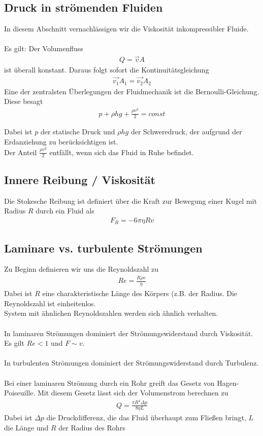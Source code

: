 \documentclass[a4paper,12pt]{report}
\begin{document}
\subsection{Druck in strömenden Fluiden}
In diesem Abschnitt vernachlässigen wir die Viskosität inkompressibler Fluide. \\
\\
Es gilt: Der Volumenfluss 
\begin{align}
Q = \vec{v} A 
\end{align}
ist überall konstant. Daraus folgt sofort die Kontinuitätsgleichung 
\begin{align}
\vec{v_1}A_1 = \vec{v_2}A_2
\end{align}
Eine der zentralsten Überlegungen der Fluidmechanik ist die Bernoulli-Gleichung. Diese besagt
\begin{align}
p + \rho hg + \frac{\rho v^2}{2} = const 
\end{align}

Dabei ist $p$ der statische Druck und $\rho hg$ der Schweredruck, der aufgrund der Erdanziehung zu berücksichtigen ist. \\
Der Anteil $\frac{\rho v^2}{2} $ entfällt, wenn sich das Fluid in Ruhe befindet.

\subsection{Innere Reibung / Viskosität}
Die Stokesche Reibung ist definiert über die Kraft zur Bewegung einer Kugel mit Radius $R$ durch ein Fluid als 
\begin{align}
F_R = -6\pi \eta Rv
\end{align}

\subsection{Laminare vs. turbulente Strömungen}
Zu Beginn definieren wir uns die Reynoldszahl zu 
\begin{align}
Re = \frac{R\rho v}{\eta}
\end{align}
Dabei ist $R$ eine charakteristische Länge des Körpers (z.B. der Radius. Die Reynoldszahl ist einheitenlos. \\
System mit ähnlichen Reynoldszahlen werden sich ähnlich verhalten. \\
\\ 
In laminaren Strömungen dominiert der Strömungswiderstand durch Viskosität. Es gilt $Re < 1$ und $F \sim v$. \\
\\
In turbulenten Strömungen dominiert der Strömungswiderstand durch Turbulenz. \\
\\
Bei einer laminaren Strömung durch ein Rohr greift das Gesetz von Hagen-Poiseuille. Mit diesem Gesetz lässt sich der Volumenstrom berechnen zu 
\begin{align}
Q = \frac{\pi R^4 \Delta p}{8\eta L}
\end{align}
Dabei ist $\Delta p$ die Druckdifferenz, die das Fluid überhaupt zum Fließen bringt, $L$ die Länge und $R$ der Radius des Rohrs 
\end{document}
